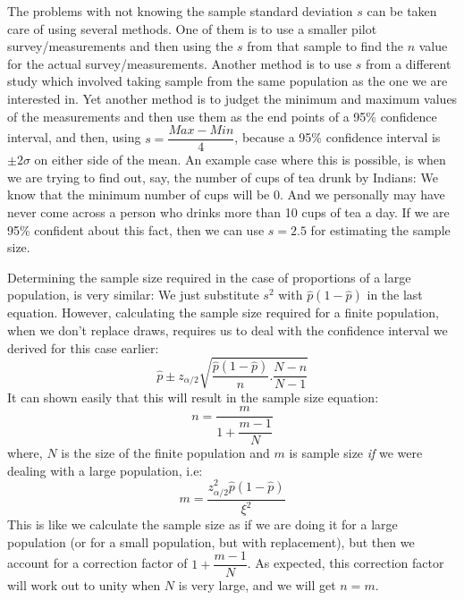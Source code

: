 The problems with not knowing the sample standard deviation $s$ can be taken care of using several methods. One of them is to use a smaller pilot survey/measurements and then using the $s$ from that sample to find the $n$ value for the actual survey/measurements. Another method is to use $s$ from a different study which involved taking sample from the same population as the one we are interested in. Yet another method is to judget the minimum and maximum values of the measurements and then use them as the end points of a 95\% confidence interval, and then, using \( s = \dfrac{Max-Min}{4} \), because a 95\% confidence interval is $\pm 2\sigma$ on either side of the mean. An example case where this is possible, is when we are trying to find out, say, the number of cups of tea drunk by Indians: We know that the minimum number of cups will be 0. And we personally may have never come across a person who drinks more than 10 cups of tea a day. If we are 95\% confident about this fact, then we can use $s = 2.5$ for estimating the sample size.

Determining the sample size required in the case of proportions of a large population, is very similar: We just substitute $s^2$ with \( \hat{p}(1-\hat{p}) \) in the last equation. However, calculating the sample size required for a finite population, when we don't replace draws, requires us to deal with the confidence interval we derived for this case earlier:
	\[ \hat{p}\pm z_{\alpha/2}\sqrt{\dfrac{\hat{p}(1-\hat{p})}{n} . \dfrac{N-n}{N-1}} \]
It can shown easily that this will result in the sample size equation:
	\[ n=\dfrac{m}{1+\dfrac{m-1}{N}} \]
where, $N$ is the size of the finite population and $m$ is sample size \emph{if} we were dealing with a large population, i.e:
	\[ m=\dfrac{z^2_{\alpha/2}\hat{p}(1-\hat{p})}{\xi^2}\]
This is like we calculate the sample size as if we are doing it for a large population (or for a small population, but with replacement), but then we account for a correction factor of \( 1+\dfrac{m-1}{N} \). As expected, this correction factor will work out to unity when $N$ is very large, and we will get $n=m$.




